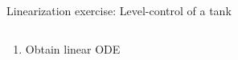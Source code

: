 \documentclass[dvisvgm,hypertex,aspectratio=169]{beamer}
\begin{document}
\begin{frame}[label=Ex1]{Linearization exercise: Level-control of a tank}
\begin{columns}
\begin{column}{0.5\columnwidth}
\begin{enumerate}
      \item Obtain linear ODE
    \end{enumerate}
  

      
    \end{column}
  \end{columns}

\end{frame}
\end{document}
